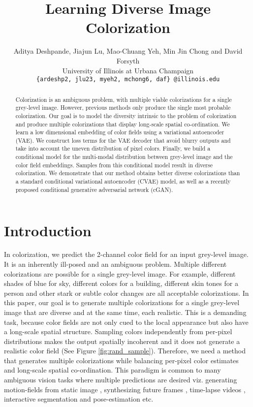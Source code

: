 \documentclass[10pt,twocolumn,letterpaper]{article}
\begin{document}
\title{Learning Diverse Image Colorization}

\author{
Aditya Deshpande, Jiajun Lu, Mao-Chuang Yeh, Min Jin Chong and David Forsyth\\
University of Illinois at Urbana Champaign\\
{\tt\small \{ardeshp2, jlu23, myeh2, mchong6, daf\} @illinois.edu}
}

\maketitle

\begin{abstract}
Colorization is an ambiguous problem, with multiple viable colorizations for a single grey-level
image. However, previous methods only produce the single most probable colorization. Our goal
is to model the diversity intrinsic to the problem of colorization and produce multiple colorizations
that display long-scale spatial co-ordination. We learn a low dimensional embedding of 
color fields using a variational autoencoder (VAE). We construct loss terms for the VAE decoder that avoid
blurry outputs and take into account the uneven distribution of pixel colors. Finally, we build
a conditional model for the multi-modal distribution between grey-level image and the
color field embeddings. Samples from this conditional model result in diverse colorization.
We demonstrate that our method obtains better diverse colorizations than a standard 
conditional variational autoencoder (CVAE) model, as well as a recently proposed conditional 
generative adversarial network (cGAN).
\end{abstract}


\section{Introduction}\label{sec:intro}

In colorization, we predict the 2-channel color field for an input
grey-level image. It is an inherently ill-posed and an ambiguous 
problem. Multiple different colorizations are possible for a 
single grey-level image. For example, different shades of blue 
for sky, different colors for a building, different skin tones for a person 
and other stark or subtle color changes  are all acceptable colorizations. 
In this paper, our goal is to generate multiple colorizations for a single grey-level image that are 
diverse and at the same time, each realistic. This is a 
demanding task, because color fields are not only cued to the
local appearance but also have a long-scale spatial structure.
Sampling colors independently from per-pixel distributions 
makes the output spatially incoherent and it does not generate a 
realistic color field (See Figure \ref{fig:rand_sample}). Therefore, we need a method that generates
multiple colorizations while balancing per-pixel color 
estimates and long-scale spatial co-ordination. This paradigm
is common to many ambiguous vision tasks where multiple 
predictions are desired viz. generating motion-fields from
static image \cite{Walker}, synthesizing future frames \cite{CrossConv}, 
time-lapse videos \cite{TLBerg}, interactive segmentation and
pose-estimation \cite{Batra} etc.
\end{document}
